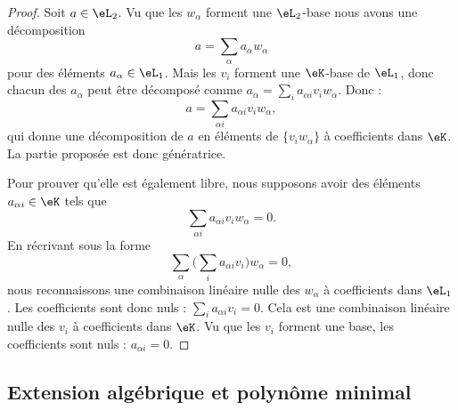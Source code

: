 \begin{proof}
    Soit \( a\in \eL_2\). Vu que les \( w_{\alpha}\) forment une \( \eL_2\)-base nous avons une décomposition
    \begin{equation}
        a=\sum_{\alpha}a_{\alpha}w_{\alpha}
    \end{equation}
    pour des éléments \( a_{\alpha}\in \eL_1\). Mais les \( v_i\) forment une \( \eK\)-base de \( \eL_1\), donc chacun des \( a_{\alpha}\) peut être décomposé comme \( a_{\alpha}=\sum_ia_{\alpha i}v_iw_{\alpha}\). Donc :
    \begin{equation}
        a=\sum_{\alpha i}a_{\alpha i}v_iw_{\alpha},
    \end{equation}
    qui donne une décomposition de \( a\) en éléments de \( \{ v_iw_{\alpha} \}\) à coefficients dans \( \eK\). La partie proposée est donc génératrice.

    Pour prouver qu'elle est également libre, nous supposons avoir des éléments \( a_{\alpha i}\in \eK\) tels que
    \begin{equation}
        \sum_{\alpha i}a_{\alpha i}v_iw_{\alpha}=0.
    \end{equation}
    En récrivant sous la forme
    \begin{equation}
        \sum_{\alpha}\Big( \sum_ia_{\alpha i}v_i \Big)w_{\alpha}=0,
    \end{equation}
    nous reconnaissons une combinaison linéaire nulle des \( w_{\alpha}\) à coefficients dans \( \eL_1\). Les coefficients sont donc nuls : \( \sum_i a_{\alpha i}v_i=0\). Cela est une combinaison linéaire nulle des \( v_i\) à coefficients dans \( \eK\). Vu que les \( v_i\) forment une base, les coefficients sont nuls : \( a_{\alpha i}=0\).
\end{proof}

\subsection{Extension algébrique et polynôme minimal}

